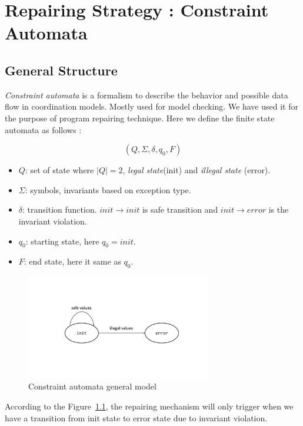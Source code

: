 \doublespacing

\chapter{Repairing Strategy : Constraint Automata}
\label{chapter:strgCA}

\section{General Structure}
\label{subsec:generalCA}

\emph{Constraint automata} is a formalism to describe the behavior and possible
data flow in coordination models.
Mostly used for model checking. We have used it for the purpose of program
repairing technique. Here we define the finite state automata as follows :

$$(Q, \Sigma, \delta, q_0, F)$$
\begin{itemize}
\item $Q$: set of state where $|Q| = 2$, \emph{legal state}(init) and
\emph{illegal state} (error).
\item $\Sigma$: symbols, invariants based on exception type.
\item $\delta$: transition function. $init \rightarrow init$ is safe transition
and $init \rightarrow error$ is the invariant violation.
\item $q_0$: starting state, here $q_0 = init$.
\item $F$: end state, here it same as $q_0$.
\end{itemize}

\begin{figure}[!htb]
\centering
\includegraphics[width=3.2in]{images/automata.pdf}
\caption{Constraint automata general model}
\label{fig:automata}
\end{figure}

According to the Figure~\ref{fig:automata}, the repairing mechanism will only
trigger when we have a transition from init state to error state due to
invariant violation.

